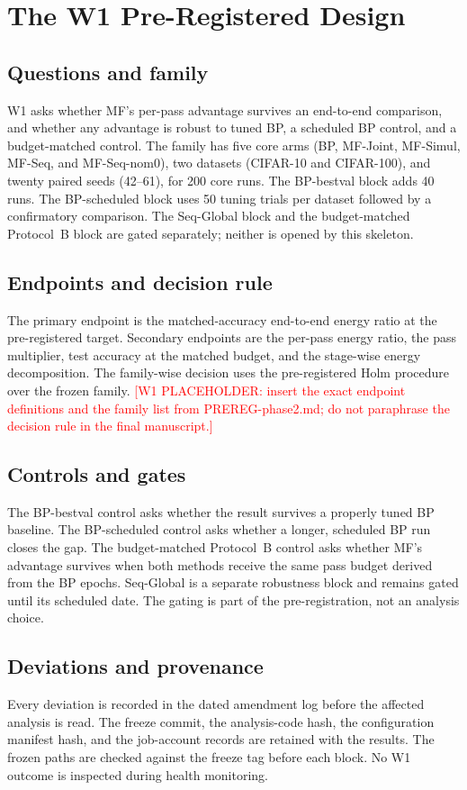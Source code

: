 \documentclass[preprint,12pt]{elsarticle}
\newcommand{\wone}[1]{\textcolor{red}{[W1 PLACEHOLDER: #1]}}
\begin{document}
\section{The W1 Pre-Registered Design}
\label{sec:w1}

\subsection{Questions and family}
W1 asks whether MF's per-pass advantage survives an end-to-end comparison, and
whether any advantage is robust to tuned BP, a scheduled BP control, and a
budget-matched control.  The family has five core arms (BP, MF-Joint, MF-Simul,
MF-Seq, and MF-Seq-nom0), two datasets (CIFAR-10 and CIFAR-100), and twenty
paired seeds (42--61), for 200 core runs.  The BP-bestval block adds 40 runs.
The BP-scheduled block uses 50 tuning trials per dataset followed by a
confirmatory comparison.  The Seq-Global block and the budget-matched
Protocol~B block are gated separately; neither is opened by this skeleton.

\subsection{Endpoints and decision rule}
The primary endpoint is the matched-accuracy end-to-end energy ratio at the
pre-registered target.  Secondary endpoints are the per-pass energy ratio, the
pass multiplier, test accuracy at the matched budget, and the stage-wise energy
decomposition.  The family-wise decision uses the pre-registered Holm
procedure over the frozen family.  \wone{insert the exact endpoint definitions
and the family list from PREREG-phase2.md; do not paraphrase the decision rule
in the final manuscript.}

\subsection{Controls and gates}
The BP-bestval control asks whether the result survives a properly tuned BP
baseline.  The BP-scheduled control asks whether a longer, scheduled BP run
closes the gap.  The budget-matched Protocol~B control asks whether MF's
advantage survives when both methods receive the same pass budget derived from
the BP epochs.  Seq-Global is a separate robustness block and remains gated
until its scheduled date.  The gating is part of the pre-registration, not an
analysis choice.

\subsection{Deviations and provenance}
Every deviation is recorded in the dated amendment log before the affected
analysis is read.  The freeze commit, the analysis-code hash, the configuration
manifest hash, and the job-account records are retained with the results.  The
frozen paths are checked against the freeze tag before each block.  No W1
outcome is inspected during health monitoring.
\end{document}
